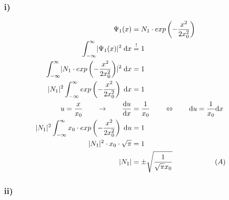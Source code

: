 \subsubsection{i)}

    \begin{align}
        \Psi_1(x) &= N_1 \cdot exp \left(- \frac{x^2}{2x_0^2} \right)\\
        \int_{-\infty}^{\infty} \lvert\Psi_1 (x)\rvert^2 \; \mathrm{d}x &\stackrel{!}{=} 1\\
        \int_{-\infty}^{\infty} \lvert N_1 \cdot exp \left(-\frac{x^2}{2x_0^2} \right)\rvert ^2 \; \mathrm{d}x &= 1 \nonumber\\
        \lvert N_1\rvert^2 \int_{-\infty}^{\infty} exp \left(-\frac{x^2}{2x_0^2} \right) \; \mathrm{d}x &= 1 \nonumber\\
        u = \frac{x}{x_0} \qquad \rightarrow \qquad \frac{\mathrm{d}u}{\mathrm{d}x} &= \frac{1}{x_0} 
        \qquad \Leftrightarrow \qquad \mathrm{d}u = \frac{1}{x_0} \mathrm{d}x \nonumber\\
        \lvert N_1\rvert^2 \int_{-\infty}^{\infty} x_0 \cdot exp \left(-\frac{x^2}{2x_0^2} \right) \; \mathrm{d}u &= 1 \nonumber\\
        \lvert N_1\rvert^2 \cdot x_0 \cdot \sqrt{\pi} &= 1 \nonumber\\
        \lvert N_1\rvert &= \pm \sqrt{\frac{1}{\sqrt{\pi}x_0}} \qquad \qquad \qquad (A)
    \end{align}

\subsubsection{ii)}


